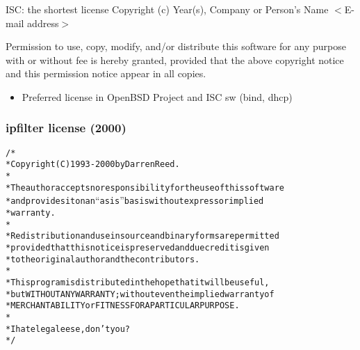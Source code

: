 
\begin{frame}

\begin{block}{ISC: the shortest license}
{\small Copyright (c) Year(s), Company or Person's Name $<$E-mail address$>$}

\medskip

\alert{Permission} to \alert{use}, \alert{copy}, \alert{modify}, and/or \alert{distribute} this software for any
purpose with or without fee is hereby granted, provided that the above
copyright notice and this permission notice appear in all copies.
\end{block}

\medskip
\begin{itemize}
\item Preferred license in OpenBSD Project and ISC sw (bind, dhcp)
\end{itemize}
\end{frame}


\begin{frame}
\frametitle{ipfilter license (2000)}

\begin{alltt}
\footnotesize
/* \\
 * Copyright (C) 1993-2000 by Darren Reed. \\
 * \\
 * The author accepts no responsibility for the use of this software \\
 * and provides it on an ``as is'' basis without express or implied \\
 *  warranty. \\
 * \\
 * Redistribution and use in source and binary forms are permitted \\
 * provided that this notice is preserved and due credit is given \\
 * to the original author and the contributors. \\
 * \\
 * This program is distributed in the hope that it will be useful, \\
 * but WITHOUT ANY WARRANTY; without even the implied warranty of \\
 * MERCHANTABILITY or FITNESS FOR A PARTICULAR PURPOSE. \\
 * \\
 * I hate legaleese, don't you ? \\
 */

\end{alltt}

\end{frame}

